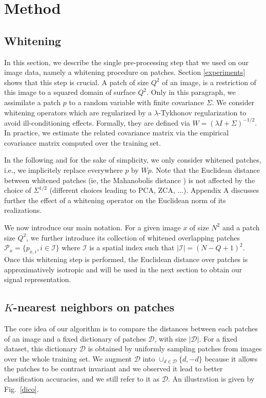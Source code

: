 \documentclass{article}
\begin{document}
{\section{Method}
\label{method}

\subsection{Whitening}

In this section, we describe the single pre-processing step that we used on our image data, namely a whitening procedure on patches. Section \ref{experiments} shows that this step is crucial. A patch of size $Q^2$ of an image, is a  restriction of this image to a squared domain of surface $Q^2$. Only in this paragraph, we assimilate a patch $p$ to a random variable with finite covariance $\Sigma$. We consider whitening operators which are regularized by a $\lambda$-Tykhonov regularization to avoid ill-conditioning effects. Formally, they are defined via $W=(\lambda I+\Sigma
)^{-1/2}$. In practice, we estimate the related covariance matrix via the empirical covariance matrix  computed over the training set.

In the following and for the sake of simplicity, we only  consider whitened patches, i.e., we implicitely replace everywhere $p$ by $Wp$. Note that the Euclidean distance between whitened patches (ie, the Mahanobolis distance \citep{chandra1936generalised, mclachlan1999mahalanobis} ) is not affected by the choice of $\Sigma^{1/2}$ (different choices leading to PCA, ZCA, ...). Appendix A discusses further the effect of a whitening operator on the Euclidean norm of its realizations.
 
 
We now introduce our main notation. For a given image $x$ of size $N^2$ and a patch size $Q^2$, we further introduce its collection of whitened overlapping patches $\mathcal{P}_x=\{p_{x,i},i\in\mathcal{I}\}$ where $\mathcal{I}$ is a spatial index such that $|\mathcal{I}|=(N-Q+1)
^2$.
Once this whitening step is performed, the Euclidean distance over patches is approximatively isotropic and will be used in the next section to obtain our signal representation.

\subsection{$K$-nearest neighbors on patches}

The core idea of our algorithm is to compare the distances between each patches of an image and a fixed dictionary of patches $\mathcal{D}$, with size $|\mathcal{D}|$.
For a fixed dataset, this dictionary $\mathcal{D}$ is obtained by uniformly sampling patches from images over the whole training set. We augment $\mathcal{D}$ into $\cup_{d\in \mathcal{D}}\{d,-d\}$ because it allows the patches to be contrast invariant and we observed it lead to better classification accuracies, and we still refer to it as $\mathcal{D}$. An illustration is given by Fig.~\ref{dico}.

}
\end{document}
